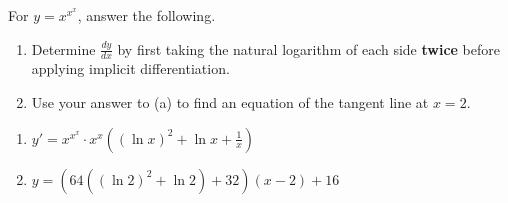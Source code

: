{For $y=x^{x^x}$, answer the following.
\begin{enumerate}
\item	Determine $\frac{dy}{dx}$ by first taking the natural logarithm of each side \textbf{twice} before applying implicit differentiation.
\item   Use your answer to (a) to find an equation of the tangent line at $x=2$.
\end{enumerate}
}
{\begin{enumerate}
\item $y'=x^{x^x}\cdot x^x \left((\ln x)^2+\ln x+\frac{1}{x}\right)$
\item $y=\left(64\left((\ln 2)^2+\ln 2\right)+32\right)(x-2)+16$
\end{enumerate}
}
